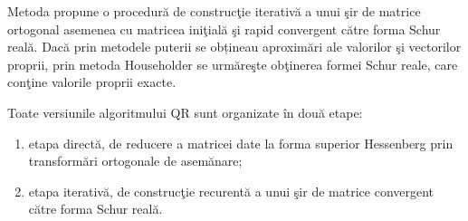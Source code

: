 \documentclass{exam}
\begin{document}
Metoda propune o procedură de construcţie iterativă a unui şir de matrice ortogonal asemenea cu matricea iniţială şi rapid convergent către forma Schur reală. Dacă prin metodele puterii se obțineau aproximări ale valorilor şi vectorilor proprii, prin metoda Householder se urmăreşte obţinerea formei Schur reale, care conţine valorile proprii exacte.

Toate versiunile algoritmului QR sunt organizate în două etape:
\begin{enumerate}
	\item etapa directă, de reducere a matricei date la forma superior Hessenberg prin
	      transformări ortogonale de asemănare;
	\item etapa iterativă, de construcţie recurentă a unui şir de matrice convergent către forma Schur reală.\\
\end{enumerate}
\end{document}
